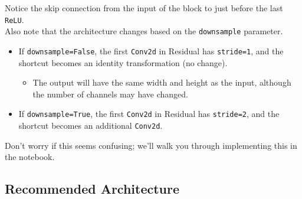 \documentclass{article}
\newcommand{\ExternalLink}{%
    \tikz[x=1.2ex, y=1.2ex, baseline=-0.05ex]{%
        \begin{scope}[x=1ex, y=1ex]
            \clip (-0.1,-0.1) 
                --++ (-0, 1.2) 
                --++ (0.6, 0) 
                --++ (0, -0.6) 
                --++ (0.6, 0) 
                --++ (0, -1);
            \path[draw, 
                line width = 0.5, 
                rounded corners=0.5] 
                (0,0) rectangle (1,1);
        \end{scope}
        \path[draw, line width = 0.5] (0.5, 0.5) 
            -- (1, 1);
        \path[draw, line width = 0.5] (0.6, 1) 
            -- (1, 1) -- (1, 0.6);
        }
    }
\newcommand{\ttt}[1]{\texttt{#1}}
\begin{document}
Notice the skip connection from the input of the block to just before the last \ttt{ReLU}. \\

Also note that the architecture changes based on the \ttt{downsample} parameter.

\begin{itemize}
    \item If \ttt{downsample=False}, the first \ttt{Conv2d} in Residual has \ttt{stride=1}, and the shortcut becomes an identity transformation (no change).
    \begin{itemize}
        \item The output will have the same width and height as the input, although the number of channels may have changed.
    \end{itemize}
    \item If \ttt{downsample=True}, the first \ttt{Conv2d} in Residual has \ttt{stride=2}, and the shortcut becomes an additional \ttt{Conv2d}.
\end{itemize}

Don't worry if this seems confusing; we'll walk you through implementing this in the notebook. 







\subsection{Recommended Architecture}
\end{document}

